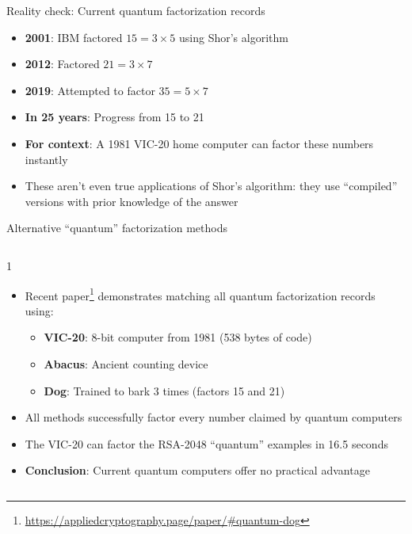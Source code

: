 \ifdefined\PRESENTATION\else\PassOptionsToClass{handout}{beamer}\fi\documentclass[aspectratio=169, lualatex]{beamer}
\begin{document}
\begin{frame}{Reality check: Current quantum factorization records}
	\begin{itemize}
		\item \textbf{2001}: IBM factored $15 = 3 \times 5$ using Shor's algorithm
		\item \textbf{2012}: Factored $21 = 3 \times 7$
		\item \textbf{2019}: Attempted to factor $35 = 5 \times 7$
		\item \textbf{In 25 years}: Progress from 15 to 21
		\item \textbf{For context}: A 1981 VIC-20 home computer can factor these numbers instantly
		\item These aren't even true applications of Shor's algorithm: they use ``compiled'' versions with prior knowledge of the answer
	\end{itemize}
\end{frame}

\begin{frame}{Alternative ``quantum'' factorization methods}
	\begin{columns}[c]
		\begin{column}{1\textwidth}
			\begin{itemize}
				\item Recent paper\footnote{\url{https://appliedcryptography.page/paper/\#quantum-dog}} demonstrates matching all quantum factorization records using:
				      \begin{itemize}
					      \item \textbf{VIC-20}: 8-bit computer from 1981 (538 bytes of code)
					      \item \textbf{Abacus}: Ancient counting device
					      \item \textbf{Dog}: Trained to bark 3 times (factors 15 and 21)
				      \end{itemize}
				\item All methods successfully factor every number claimed by quantum computers
				\item The VIC-20 can factor the RSA-2048 ``quantum'' examples in 16.5 seconds
				\item \textbf{Conclusion}: Current quantum computers offer no practical advantage
			\end{itemize}
		\end{column}
	\end{columns}
\end{frame}
\end{document}
